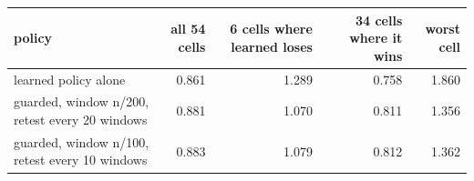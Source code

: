 \begin{tabular}{lrrrr}
\toprule
policy & all 54 cells & 6 cells where learned loses & 34 cells where it wins & worst cell \\
\midrule
learned policy alone & 0.861 & 1.289 & 0.758 & 1.860 \\
guarded, window n/200, retest every 20 windows & 0.881 & 1.070 & 0.811 & 1.356 \\
guarded, window n/100, retest every 10 windows & 0.883 & 1.079 & 0.812 & 1.362 \\
\bottomrule
\end{tabular}

